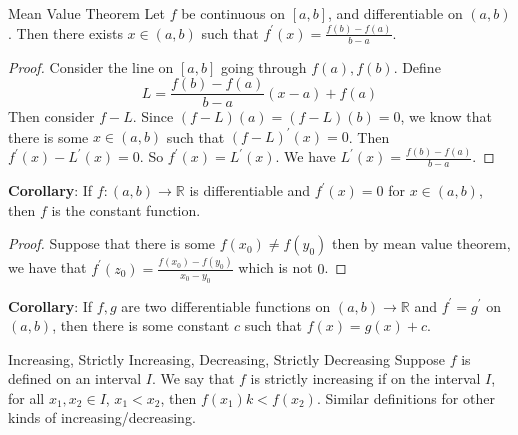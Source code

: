 \documentclass{report}
\begin{document}
\begin{theorem}{Mean Value Theorem}
    Let $f$ be continuous on $[a, b]$, and differentiable on $(a, b)$. Then there exists $x \in (a, b)$ such that $f^{\prime}(x) = \frac{f(b) - f(a)}{b - a}$.
\end{theorem}
    \begin{proof}
        Consider the line on $[a, b]$ going through $f(a), f(b)$. Define 
            \begin{equation*}
                L = \dfrac{f(b) - f(a)}{b - a}(x - a) + f(a)
            \end{equation*}
        Then consider $f - L$. Since $(f - L)(a) = (f - L)(b) = 0$, we know that there is some $x \in (a, b)$ such that $(f - L)^{\prime}(x) = 0$. Then $f^{\prime}(x) - L^{\prime}(x) = 0$. So $f^{\prime}(x) = L^{\prime}(x)$. We have $L^{\prime}(x) = \frac{f(b) - f(a)}{b - a}$.
    \end{proof}

\textbf{Corollary}: If $f : (a, b) \rightarrow \mathbb{R}$ is differentiable and $f^{\prime}(x) = 0$ for $x \in (a, b)$, then $f$ is the constant function.
    \begin{proof}
        Suppose that there is some $f(x_{0}) \neq f(y_{0})$ then by mean value theorem, we have that $f^{\prime}(z_{0}) = \frac{f(x_{0}) - f(y_{0})}{x_{0} - y_{0}}$ which is not $0$.
    \end{proof}

\textbf{Corollary}: If $f, g$ are two differentiable functions on $(a, b) \rightarrow \mathbb{R}$ and $f^{\prime} = g^{\prime}$ on $(a, b)$, then there is some constant $c$ such that $f(x) = g(x) + c$.

\begin{definition}{Increasing, Strictly Increasing, Decreasing, Strictly Decreasing}
    Suppose $f$ is defined on an interval $I$. We say that $f$ is strictly increasing if on the interval $I$, for all $x_{1} , x_{2} \in I$, $x_{1} < x_{2}$, then $f(x_{1})k < f(x_{2})$. Similar definitions for other kinds of increasing/decreasing.
\end{definition}
\end{document}
